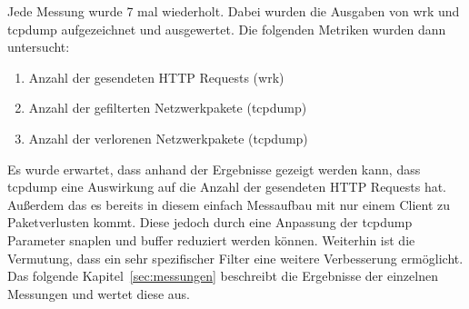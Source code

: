 Jede Messung wurde 7 mal wiederholt. Dabei wurden die Ausgaben von
wrk und tcpdump aufgezeichnet und ausgewertet. Die folgenden Metriken
wurden dann untersucht:

\begin{enumerate}
\item Anzahl der gesendeten HTTP Requests (wrk)
\item Anzahl der gefilterten Netzwerkpakete (tcpdump)
\item Anzahl der verlorenen Netzwerkpakete (tcpdump)
\end{enumerate}

Es wurde erwartet, dass anhand der Ergebnisse gezeigt werden kann, dass tcpdump
eine Auswirkung auf die Anzahl der gesendeten HTTP Requests hat. Außerdem
das es bereits in diesem einfach Messaufbau mit nur einem Client zu Paketverlusten
kommt. Diese jedoch durch eine Anpassung der tcpdump Parameter snaplen und buffer
reduziert werden können. Weiterhin ist die Vermutung, dass ein sehr spezifischer
Filter eine weitere Verbesserung ermöglicht. Das folgende Kapitel~\ref{sec:messungen}
beschreibt die Ergebnisse der einzelnen Messungen und wertet diese aus.
